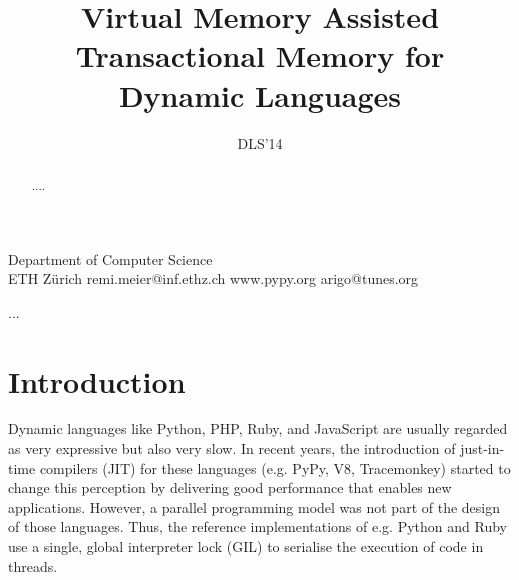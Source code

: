 \documentclass{sigplanconf}
\begin{document}
\setlength{\pdfpageheight}{\paperheight}
\setlength{\pdfpagewidth}{\paperwidth}






\title{Virtual Memory Assisted Transactional Memory for Dynamic Languages}
\subtitle{DLS'14}

           {Department of Computer Science\\ ETH Zürich}
           {remi.meier@inf.ethz.ch}
           {www.pypy.org}
           {arigo@tunes.org}

\maketitle

\begin{abstract}
....
\end{abstract}



\keywords
...

\section{Introduction}


Dynamic languages like Python, PHP, Ruby, and JavaScript are usually
regarded as very expressive but also very slow. In recent years, the
introduction of just-in-time compilers (JIT) for these languages (e.g.
PyPy, V8, Tracemonkey) started to change this perception by delivering
good performance that enables new applications. However, a parallel
programming model was not part of the design of those languages. Thus,
the reference implementations of e.g. Python and Ruby use a single,
global interpreter lock (GIL) to serialise the execution of code in
threads.
\end{document}
